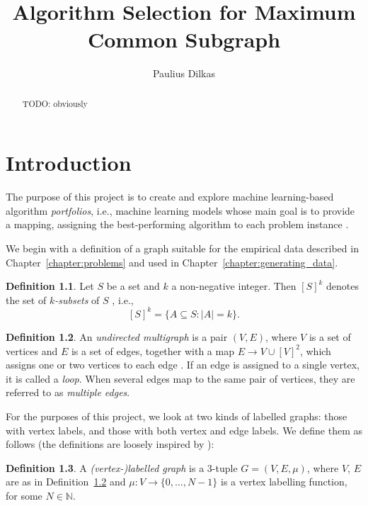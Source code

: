 \documentclass{l4proj}
\title{Algorithm Selection for Maximum Common Subgraph}
\author{Paulius Dilkas}
\theoremstyle{definition}
\newtheorem{definition}{Definition}[chapter]
\theoremstyle{remark}
\begin{document}
\maketitle

\begin{abstract}
  TODO: obviously
\end{abstract}

\educationalconsent
\tableofcontents

\chapter{Introduction}

The purpose of this project is to create and explore machine learning-based
algorithm \emph{portfolios}, i.e., machine learning models whose main goal is to
provide a mapping, assigning the best-performing algorithm to each problem
instance \cite{DBLP:journals/ai/BischlKKLMFHHLT16, DBLP:journals/ac/Rice76}.

We begin with a definition of a graph suitable for the empirical data described
in Chapter~\ref{chapter:problems} and used in
Chapter~\ref{chapter:generating_data}.

\begin{definition}
  Let $S$ be a set and $k$ a non-negative integer. Then $[S]^k$ denotes
  the set of \emph{$k$-subsets} of $S$ \cite{subset}, i.e.,
  \[ [S]^k = \{ A \subseteq S : |A| = k \}. \]
\end{definition}

\begin{definition} \label{def:graph}
  An \emph{undirected multigraph} is a pair $(V, E)$, where $V$ is a set of
  vertices and $E$ is a set of edges, together with a map $E \to V \cup [V]^2$,
  which assigns one or two vertices to each edge
  \cite{DBLP:books/daglib/0030488}. If an edge is assigned to a single vertex,
  it is called a \emph{loop}. When several edges map to the same pair of
  vertices, they are referred to as \emph{multiple edges}. 
\end{definition}

For the purposes of this project, we look at two kinds of labelled graphs: those
with vertex labels, and those with both vertex and edge labels. We define them
as follows (the definitions are loosely inspired by \cite{abu-aisheh_2016}):

\begin{definition} \label{def:vertex_label}
  A \emph{(vertex-)labelled graph} is a 3-tuple $G = (V, E, \mu)$, where $V$,
  $E$ are as in Definition~\ref{def:graph} and $\mu \colon V \to \{ 0, \dots, N
  - 1 \}$ is a vertex labelling function, for some $N \in \mathbb{N}$.
\end{definition}
\end{document}

